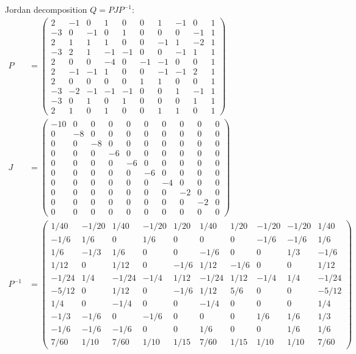 \documentclass{article}
\theoremstyle{plain}
\theoremstyle{definition}
\begin{document}
Jordan decomposition $Q = P J P^{-1}$:
\begin{align}
	P &=
	\begin{pmatrix}
		2 & -1 & 0 & 1 & 0 & 0 & 1 & -1 & 0 & 1 \\
		-3 & 0 & -1 & 0 & 1 & 0 & 0 & 0 & -1 & 1 \\
		2 & 1 & 1 & 1 & 0 & 0 & -1 & 1 & -2 & 1 \\
		-3 & 2 & 1 & -1 & -1 & 0 & 0 & -1 & 1 & 1 \\
		2 & 0 & 0 & -4 & 0 & -1 & -1 & 0 & 0 & 1 \\
		2 & -1 & -1 & 1 & 0 & 0 & -1 & -1 & 2 & 1 \\
		2 & 0 & 0 & 0 & 0 & 1 & 1 & 0 & 0 & 1 \\
		-3 & -2 & -1 & -1 & -1 & 0 & 0 & 1 & -1 & 1 \\
		-3 & 0 & 1 & 0 & 1 & 0 & 0 & 0 & 1 & 1 \\
		2 & 1 & 0 & 1 & 0 & 0 & 1 & 1 & 0 & 1
	\end{pmatrix} \\
	J &=
	\begin{pmatrix}
		-10 & 0 & 0 & 0 & 0 & 0 & 0 & 0 & 0 & 0 \\
		0 & -8 & 0 & 0 & 0 & 0 & 0 & 0 & 0 & 0 \\
		0 & 0 & -8 & 0 & 0 & 0 & 0 & 0 & 0 & 0 \\
		0 & 0 & 0 & -6 & 0 & 0 & 0 & 0 & 0 & 0 \\
		0 & 0 & 0 & 0 & -6 & 0 & 0 & 0 & 0 & 0 \\
		0 & 0 & 0 & 0 & 0 & -6 & 0 & 0 & 0 & 0 \\
		0 & 0 & 0 & 0 & 0 & 0 & -4 & 0 & 0 & 0 \\
		0 & 0 & 0 & 0 & 0 & 0 & 0 & -2 & 0 & 0 \\
		0 & 0 & 0 & 0 & 0 & 0 & 0 & 0 & -2 & 0 \\
		0 & 0 & 0 & 0 & 0 & 0 & 0 & 0 & 0 & 0
	\end{pmatrix} \\
	P^{-1} &=
	\begin{pmatrix}
		1/40 & -1/20 & 1/40 & -1/20 & 1/20 & 1/40 & 1/20 & -1/20 & -1/20 & 1/40 \\
		-1/6 & 1/6 & 0 & 1/6 & 0 & 0 & 0 & -1/6 & -1/6 & 1/6 \\
		1/6 & -1/3 & 1/6 & 0 & 0 & -1/6 & 0 & 0 & 1/3 & -1/6 \\
		1/12 & 0 & 1/12 & 0 & -1/6 & 1/12 & -1/6 & 0 & 0 & 1/12 \\
		-1/24 & 1/4 & -1/24 & -1/4 & 1/12 & -1/24 & 1/12 & -1/4 & 1/4 & -1/24 \\
		-5/12 & 0 & 1/12 & 0 & -1/6 & 1/12 & 5/6 & 0 & 0 & -5/12 \\
		1/4 & 0 & -1/4 & 0 & 0 & -1/4 & 0 & 0 & 0 & 1/4 \\
		-1/3 & -1/6 & 0 & -1/6 & 0 & 0 & 0 & 1/6 & 1/6 & 1/3 \\
		-1/6 & -1/6 & -1/6 & 0 & 0 & 1/6 & 0 & 0 & 1/6 & 1/6 \\
		7/60 & 1/10 & 7/60 & 1/10 & 1/15 & 7/60 & 1/15 & 1/10 & 1/10 & 7/60
	\end{pmatrix}
\end{align}
\end{document}
